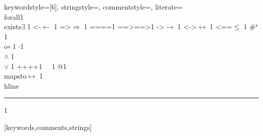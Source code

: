 {  keywordstyle=[6]\color{cRed},
  stringstyle=\ttfamily,
  commentstyle={\ttfamily\color{cGreen}},
  literate=
    {\\forall}{{\color{dkgreen}{$\forall\;$}}}1
    {\\exists}{{$\exists\;$}}1
    {<-}{{$\leftarrow\;$}}1
    {=>}{{$\Rightarrow\;$}}1
    {==}{{\textsc{==}\;}}1
    {==>}{{\textsc{==>}\;}}1
    {->}{{$\rightarrow\;$}}1
    {<->}{{$\leftrightarrow\;$}}1
    {<==}{{$\leq\;$}}1
    {\#}{{$^\star$}}1 
    {\\o}{{$\circ\;$}}1 
    {\@}{{$\cdot$}}1 
    {\/\\}{{$\wedge\;$}}1
    {\\\/}{{$\vee\;$}}1
    {++}{{\textsc{++}}}1
    {~}{{\ }}1
    {\@\@}{{$@$}}1
    {\\mapsto}{{$\mapsto\;$}}1
    {\\hline}{{\rule{\linewidth}{0.5pt}}}1
  }[keywords,comments,strings]

